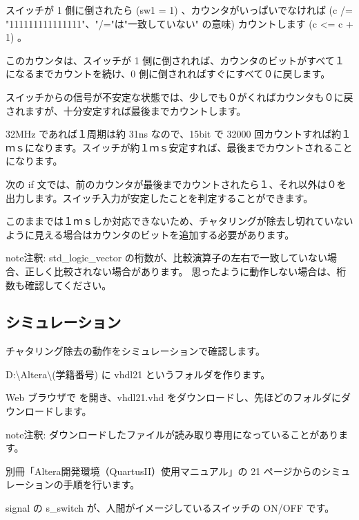 \documentclass[letterpaper,10pt,dvipdfmx]{sphinxmanual}
\begin{document}
スイッチが 1 側に倒されたら (sw1 = \textquotesingle{}1\textquotesingle{}) 、カウンタがいっぱいでなければ (c /= "111111111111111"、"/="は"一致していない" の意味) カウントします (c \textless{}= c + 1) 。

このカウンタは、スイッチが 1 側に倒されれば、カウンタのビットがすべて１になるまでカウントを続け、0 側に倒されればすぐにすべて０に戻します。

スイッチからの信号が不安定な状態では、少しでも０がくればカウンタも０に戻されますが、十分安定すれば最後までカウントします。

32MHz であれば１周期は約 31ns なので、15bit で 32000 回カウントすれば約１ｍｓになります。スイッチが約１ｍｓ安定すれば、最後までカウントされることになります。

次の if 文では、前のカウンタが最後までカウントされたら１、それ以外は０を出力します。スイッチ入力が安定したことを判定することができます。

このままでは１ｍｓしか対応できないため、チャタリングが除去し切れていないように見える場合はカウンタのビットを追加する必要があります。

\begin{sphinxadmonition}{note}{注釈:}
std\_logic\_vector の桁数が、比較演算子の左右で一致していない場合、正しく比較されない場合があります。
思ったように動作しない場合は、桁数も確認してください。
\end{sphinxadmonition}


\subsection{シミュレーション}
\label{\detokenize{05_try:id19}}
チャタリング除去の動作をシミュレーションで確認します。

D:\textbackslash{}Altera\textbackslash{}(学籍番号) に vhdl21 というフォルダを作ります。

Web ブラウザで  を開き、vhdl21.vhd をダウンロードし、先ほどのフォルダにダウンロードします。

\begin{sphinxadmonition}{note}{注釈:}
ダウンロードしたファイルが読み取り専用になっていることがあります。
\end{sphinxadmonition}

別冊「Altera開発環境（QuartusII）使用マニュアル」の 21 ページからのシミュレーションの手順を行います。

signal の s\_switch が、人間がイメージしているスイッチの ON/OFF です。
\end{document}
